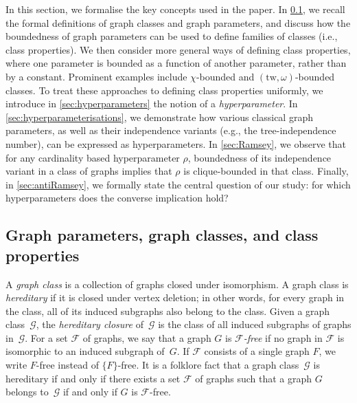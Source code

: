 \documentclass[11pt]{article}
\newcommand{\tw}{\mathrm{tw}}
\theoremstyle{plain}
\theoremstyle{definition}
\theoremstyle{remark}
\numberwithin{equation}{section}
\begin{document}
In this section, we formalise the key concepts used in the paper. In \cref{sec:gp-gc-cp}, we recall the formal definitions of graph classes and graph parameters, and discuss how the boundedness of graph parameters can be used to define families of classes (i.e., class properties). We then consider more general ways of defining class properties, where one parameter is bounded as a function of another parameter, rather than by a constant. Prominent examples include $\chi$-bounded and $(\tw, \omega)$-bounded classes.  
To treat these approaches to defining class properties uniformly, we introduce in \cref{sec:hyperparameters} the notion of a \emph{hyperparameter}. 
In \cref{sec:hyperparameterisations}, we demonstrate how various classical graph parameters, as well as their independence variants (e.g., the tree-independence number), can be expressed as hyperparameters.  
In \cref{sec:Ramsey}, we observe that for any cardinality based hyperparameter $\rho$, boundedness of its independence variant in a class of graphs implies that $\rho$ is clique-bounded in that class. 
Finally, in \cref{sec:antiRamsey}, we formally state the central question of our study: for which hyperparameters does the converse implication hold?

\subsection{Graph parameters, graph classes, and class properties}\label{sec:gp-gc-cp}

\medskip
{} 
A \emph{graph class} is a collection of graphs closed under isomorphism.
A graph class is \emph{hereditary} if it is closed under vertex deletion; in other words, for every graph in the class, all of its induced subgraphs also belong to the class. Given a graph class~$\mathcal{G}$, the \emph{hereditary closure} of~$\mathcal{G}$ is the class of all induced subgraphs of graphs in~$\mathcal{G}$.
For a set $\mathcal{F}$ of graphs, we say that a graph $G$ is \emph{$\mathcal{F}$-free} if no graph in $\mathcal{F}$ is isomorphic to an induced subgraph of~$G$. 
If $\mathcal{F}$ consists of a single graph $F$, we write $F$-free instead of $\{F\}$-free.  
It is a folklore fact that a graph class~$\mathcal{G}$ is hereditary if and only if there exists a set $\mathcal{F}$ of graphs such that a graph $G$ belongs to~$\mathcal{G}$ if and only if $G$ is $\mathcal{F}$-free.
\end{document}

